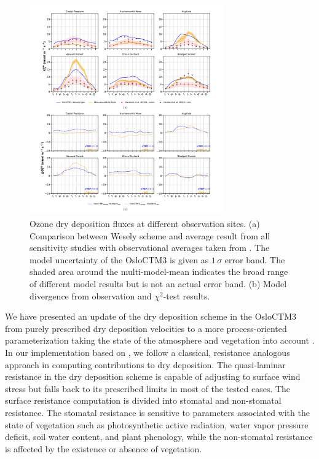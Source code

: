 \documentclass[gmd, manuscript]{copernicus}
\begin{document}
%
\begin{figure}[t]
  \includegraphics[width=8.3cm]{fig08}
  \caption{Ozone dry deposition fluxes at different observation sites. (a) Comparison between Wesely scheme and average result from all sensitivity studies with observational averages taken from \citet{ACP:Hardacre2015}. The model uncertainty of the OsloCTM3 is given as $1\,\sigma$ error band. The shaded area around the multi-model-mean indicates the broad range of different model results but is not an actual error band. (b) Model divergence from observation and $\chi^2$-test results.}
  \label{fig:mmm_drydep_stations}
\end{figure}

\label{sec:conc}
We have presented an update of the dry deposition scheme in the OsloCTM3 from purely prescribed dry deposition velocities \citep{AE:Wesely1989,JGR:Hough1991} to a more process-oriented parameterization taking the state of the atmosphere and vegetation into account \citep{ACP:Simpson2012}. In our implementation based on \citet{ACP:Simpson2012}, we follow a classical, resistance analogous approach in computing contributions to dry deposition. The quasi-laminar resistance in the dry deposition scheme is capable of adjusting to surface wind stress but falls back to its prescribed limits in most of the tested cases. The surface resistance computation is divided into stomatal and non-stomatal resistance. The stomatal resistance is sensitive to parameters associated with the state of vegetation such as photosynthetic active radiation, water vapor pressure deficit, soil water content, and plant phenology, while the non-stomatal resistance is affected by the existence or absence of vegetation.
\end{document}
